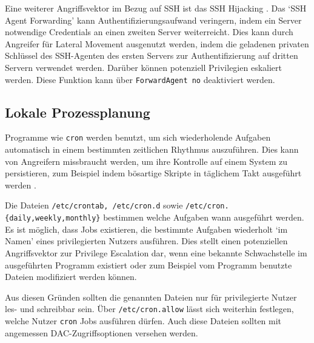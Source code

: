 Eine weiterer Angriffsvektor im Bezug auf SSH ist das SSH Hijacking \cite{mitre-ssh-hijack}. Das `SSH Agent Forwarding' kann Authentifizierungsaufwand veringern, indem ein Server notwendige Credentials an einen zweiten Server weiterreicht. Dies kann durch Angreifer für Lateral Movement ausgenutzt werden, indem die geladenen privaten Schlüssel des SSH-Agenten des ersten Servers zur Authentifizierung auf dritten Servern verwendet werden. Darüber können potenziell Privilegien
eskaliert werden. Diese Funktion kann über \texttt{ForwardAgent no} deaktiviert werden.

\subsection{Lokale Prozessplanung}

Programme wie \texttt{cron} werden benutzt, um sich wiederholende Aufgaben automatisch in einem bestimmten zeitlichen Rhythmus auszuführen. Dies kann von Angreifern missbraucht werden, um ihre Kontrolle auf einem System zu persistieren, zum Beispiel indem bösartige Skripte in täglichem Takt ausgeführt werden \cite{mitre-local-job}.

Die Dateien \texttt{/etc/crontab, /etc/cron.d} sowie \texttt{/etc/cron.\{daily,weekly,monthly\}} bestimmen welche Aufgaben wann ausgeführt werden. Es ist möglich, dass Jobs existieren, die bestimmte Aufgaben wiederholt `im Namen' eines privilegierten Nutzers ausführen. Dies stellt einen potenziellen Angriffsvektor zur Privilege Escalation dar, wenn eine bekannte Schwachstelle im ausgeführten Programm existiert oder zum Beispiel vom Programm benutzte Dateien modifiziert
werden können.

Aus diesen Gründen sollten die genannten Dateien nur für privilegierte Nutzer les- und schreibbar sein. Über \texttt{/etc/cron.allow} lässt sich weiterhin festlegen, welche Nutzer \texttt{cron} Jobs ausführen dürfen. Auch diese Dateien sollten mit angemessen DAC-Zugriffsoptionen versehen werden.

